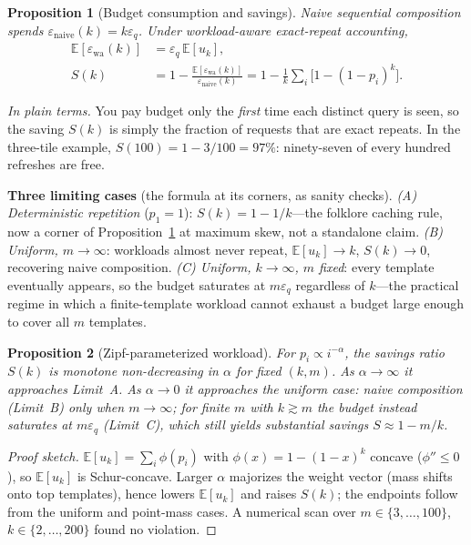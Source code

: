 \documentclass[sigconf,nonacm]{acmart}
\newcommand{\eps}{\varepsilon}
\newcommand{\E}{\mathbb{E}}
\newtheorem{prop}{Proposition}
\begin{document}
\begin{prop}[Budget consumption and savings]
\label{prop:savings}
Naive sequential composition spends $\eps_{\mathrm{naive}}(k)=k\eps_q$. Under workload-aware exact-repeat accounting,
\begin{align*}
\E[\eps_{\mathrm{wa}}(k)]&=\eps_q\,\E[u_k],\\
S(k)&=1-\frac{\E[\eps_{\mathrm{wa}}(k)]}{\eps_{\mathrm{naive}}(k)}=1-\frac{1}{k}\sum_i\bigl[1-(1-p_i)^k\bigr].
\end{align*}
\end{prop}

\noindent\emph{In plain terms.} You pay budget only the \emph{first} time each distinct query is seen, so the saving $S(k)$ is simply the fraction of requests that are exact repeats. In the three-tile example, $S(100)=1-3/100=97\%$: ninety-seven of every hundred refreshes are free.

\noindent\textbf{Three limiting cases} (the formula at its corners, as sanity checks). \emph{(A) Deterministic repetition} ($p_1{=}1$): $S(k)=1-1/k$---the folklore caching rule, now a corner of Proposition~\ref{prop:savings} at maximum skew, not a standalone claim. \emph{(B) Uniform, $m\to\infty$}: workloads almost never repeat, $\E[u_k]\to k$, $S(k)\to0$, recovering naive composition. \emph{(C) Uniform, $k\to\infty$, $m$ fixed}: every template eventually appears, so the budget saturates at $m\eps_q$ regardless of $k$---the practical regime in which a finite-template workload cannot exhaust a budget large enough to cover all $m$ templates.

\begin{prop}[Zipf-parameterized workload]
\label{prop:zipf}
For $p_i\propto i^{-\alpha}$, the savings ratio $S(k)$ is monotone non-decreasing in $\alpha$ for fixed $(k,m)$. As $\alpha\to\infty$ it approaches Limit~A. As $\alpha\to0$ it approaches the uniform case: naive composition (Limit~B) \emph{only when $m\to\infty$}; for finite $m$ with $k\gtrsim m$ the budget instead saturates at $m\eps_q$ (Limit~C), which still yields substantial savings $S\approx1-m/k$.
\end{prop}
\begin{proof}[Proof sketch]
$\E[u_k]=\sum_i\phi(p_i)$ with $\phi(x)=1-(1-x)^k$ concave ($\phi''\le0$), so $\E[u_k]$ is Schur-concave. Larger $\alpha$ majorizes the weight vector (mass shifts onto top templates), hence lowers $\E[u_k]$ and raises $S(k)$; the endpoints follow from the uniform and point-mass cases. A numerical scan over $m\in\{3,\dots,100\}$, $k\in\{2,\dots,200\}$ found no violation.
\end{proof}
\end{document}
